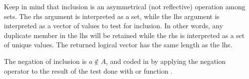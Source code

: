 \documentclass[krantz2]{krantz}\usepackage{knitr}
\begin{document}
\begin{explainbox}
Keep in mind that inclusion is an asymmetrical (not reflective) operation among sets. The rhs argument is interpreted as a set, while the lhs argument is interpreted as a vector of values to test for inclusion. In other words, any duplicate member in the lhs will be retained while the rhs is interpreted as a set of unique values. The returned logical vector has the same length as the lhs.
\begin{knitrout}\footnotesize
{}\color{fgcolor}
\end{knitrout}
\end{explainbox}

The negation of inclusion is $a \not\in A$, and coded in \Rlang by applying the negation operator \Roperator{!} to the result of the test done with  or function .

\begin{knitrout}\footnotesize
{}\color{fgcolor}
\end{knitrout}
\end{document}
